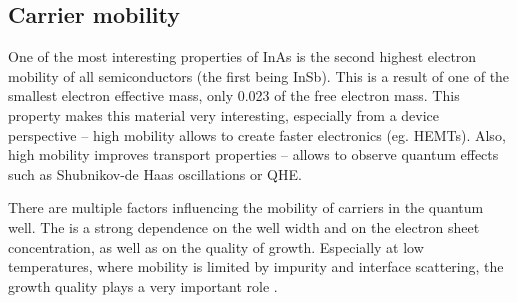 \documentclass[titlepage,a4paper]{book}
\begin{document}
\subsection{Carrier mobility}
One of the most interesting properties of InAs is the second highest electron mobility of all semiconductors (the first being InSb). This is a result of one of the smallest electron effective mass, only 0.023 of the free electron mass. This property makes this material very interesting, especially from a device perspective -- high mobility allows to create faster electronics (eg. HEMTs). Also, high mobility improves transport properties -- allows to  observe quantum effects such as Shubnikov-de Haas oscillations or QHE.

There are multiple factors influencing the mobility of carriers in the quantum well. The is a strong dependence on the well width and on the electron sheet concentration, as well as on the quality of growth. Especially at low temperatures, where mobility is limited by impurity and interface scattering, the growth quality plays a very important role \cite{Nguyen_Mobility}.
\end{document}
